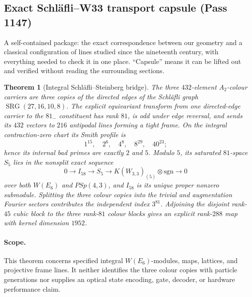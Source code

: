 \documentclass[11pt]{article}
\newtheorem{theorem}{Theorem}[section]
\begin{document}
\subsection{Exact Schl\"afli--W33 transport capsule (Pass 1147)}

\begin{plainbox}
A self-contained package: the exact correspondence between our geometry and a
classical configuration of lines studied since the nineteenth century, with everything
needed to check it in one place. ``Capsule'' means it can be lifted out and verified without
reading the surrounding sections.
\end{plainbox}

\label{sec:schlaefli-w33-exact-capsule}

\begin{theorem}[Integral Schl\"afli--Steinberg bridge]
The three $432$-element $A_2$-colour carriers are three copies of the
directed edges of the Schl\"afli graph
$\operatorname{SRG}(27,16,10,8)$.  The explicit equivariant transform from
one directed-edge carrier to the $81_-$ constituent has rank $81$, is odd
under edge reversal, and sends its $432$ vectors to $216$ antipodal lines
forming a tight frame.  On the integral contraction-zero chart its Smith
profile is
\[
  1^{15},\quad 2^6,\quad 4^8,\quad 8^{29},\quad 40^{23};
\]
hence its internal bad primes are exactly $2$ and $5$.  Modulo $5$, its
saturated $81$-space $S_5$ lies in the nonsplit exact sequence
\[
  0\longrightarrow I_{58}\longrightarrow S_5
  \longrightarrow K(W_{3,3})_{(5)}\otimes\mathrm{sgn}
  \longrightarrow0
\]
over both $W(E_6)$ and $PSp(4,3)$, and $I_{58}$ is its unique proper
nonzero submodule.  Splitting the three colour copies into the trivial and
augmentation Fourier sectors contributes the independent index $3^{81}$.
Adjoining the disjoint rank-$45$ cubic block to the three rank-$81$ colour
blocks gives an explicit rank-$288$ map with kernel dimension $1952$.
\end{theorem}

\paragraph{Scope.}
This theorem concerns specified integral $W(E_6)$-modules, maps, lattices,
and projective frame lines.  It neither identifies the three colour copies
with particle generations nor supplies an optical state encoding, gate,
decoder, or hardware performance claim.



\end{document}
